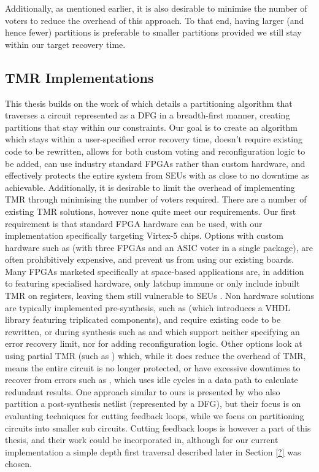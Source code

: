 \documentclass[12pt,final,oneside]{dwThesis} %
\begin{document}
   Additionally, as mentioned earlier, it is also desirable to minimise the number of voters to reduce the overhead of this approach. To that end, having larger (and hence fewer) partitions is preferable to smaller partitions provided we still stay within our target recovery time.

   \subsection{\gls{TMR} Implementations}
   This thesis builds on the work of\cite{DiesselChange} which details a partitioning algorithm that traverses a circuit represented as a \gls{DFG} in a breadth-first manner, creating partitions that stay within our constraints.
   Our goal is to create an algorithm which stays within a user-specified error recovery time, doesn't require existing code to be rewritten, allows for both custom voting and reconfiguration logic to be added, can use industry standard \glspl{FPGA} rather than custom hardware, and effectively protects the entire system from \glspl{SEU} with as close to no downtime as achievable.
   Additionally, it is desirable to limit the overhead of implementing \gls{TMR} through minimising the number of voters required.
   There are a number of existing \gls{TMR} solutions, however none quite meet our requirements.
   Our first requirement is that standard \gls{FPGA} hardware can be used, with our implementation specifically targeting Virtex-5 chips. Options with custom hardware such as \cite{VFPGATMR} (with three \glspl{FPGA} and an \gls{ASIC} voter in a single package), are often prohibitively expensive, and prevent us from using our existing boards.
   Many \glspl{FPGA} marketed specifically at space-based applications are, in addition to featuring specialised hardware, only latchup immune or only include inbuilt \gls{TMR} on registers, leaving them still vulnerable to \glspl{SEU} \cite{FPGAReview}.
   Non hardware solutions are typically implemented pre-synthesis, such as \cite{ftmr} (which introduces a \gls{VHDL} library featuring triplicated components), and require existing code to be rewritten, or during synthesis such as \cite{synplify} and \cite{tmrtool} which support neither specifying an error recovery limit, nor for adding reconfiguration logic.
   Other options look at using partial \gls{TMR} (such as \cite{partialTMR}) which, while it does reduce the overhead of \gls{TMR}, means the entire circuit is no longer protected, or have excessive downtimes to recover from errors such as \cite{VTMR}, which uses idle cycles in a data path to calculate redundant results.
   One approach similar to ours is presented by \cite{PostSynth} who also partition a post-synthesis netlist (represented by a \gls{DFG}), but their focus is on evaluating techniques for cutting feedback loops, while we focus on partitioning circuits into smaller sub circuits. Cutting feedback loops is however a part of this thesis, and their work could be incorporated in, although for our current implementation a simple depth first traversal described later in Section \ref{?} was chosen.
\end{document}
